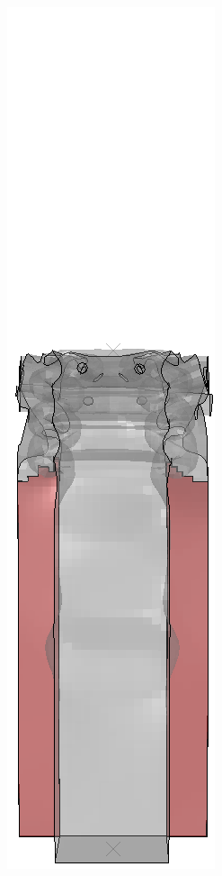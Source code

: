 \documentclass[
documentsize = a4, %
font = cmr, %
typesize = 11, %
printmode = true,
onehalfspacing = true,
language = en, %
titlepage = udciccp, %
degree = pt, %
dedication = true,
acknowledgements = true,
abstract-en = true,
abstract-es = false,
abstract-ga = false,
epigraphs = true,
toc = true,
lof = true,
lot = true,
frontmatterintoc = false,
notation = false,
minimal = false,
]{UDCthesis}
\begin{document}
\begin{figure}
\begin{minipage}[b]{.06\linewidth}
	\end{minipage}
	\quad
	\begin{minipage}[b]{.06\linewidth}
		\centering
		\includegraphics[width=\linewidth]{IMG_CUTRES/a8}

\end{minipage}
\end{figure}
\end{document}
